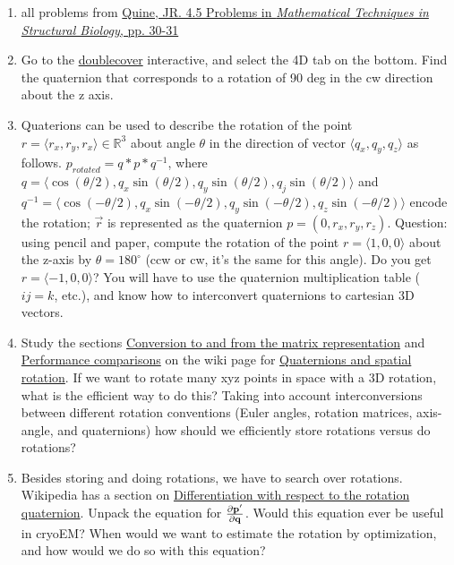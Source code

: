 \documentclass[11pt, oneside]{article}   	%
\begin{document}
\begin{enumerate}
	\item all problems from \href{https://accio.github.io/AMIDD/assets/2020/04/JRQuine-MathBiophysicsBook.pdf}{Quine, JR. 4.5 Problems in {\it Mathematical Techniques in Structural Biology},  pp. 30-31}
	\item Go to the \href{https://eater.net/quaternions/video/doublecover}{doublecover} interactive, and select the 4D tab on the bottom. Find the quaternion that corresponds to a rotation of 90 deg in the cw direction about the z axis.
	\item Quaterions can be used to describe the rotation of the point $ r= \langle r_x,r_y,r_x \rangle \in \mathbb{R}^3$ about angle $\theta$ in the direction of vector $\langle q_x,q_y,q_z \rangle$ as follows. $p_{rotated} = q*p*q^{-1}$, where $q = \langle \cos(\theta/2),q_x\sin(\theta/2),q_y\sin(\theta/2),q_j\sin(\theta/2)\rangle$ and \\ $q^{-1}=\langle \cos(-\theta/2),q_x\sin(-\theta/2),q_y\sin(-\theta/2),q_z\sin(-\theta/2) \rangle$ encode the rotation; $\vec r$ is represented as the quaternion $p=(0,r_x,r_y,r_z)$. Question: using pencil and paper, compute the rotation of the point $ r=\langle1,0,0\rangle$ about the z-axis by $\theta=180^{\circ}$ (ccw or cw, it's the same for this angle). Do you get $r=\langle-1,0,0\rangle$? You will have to use the quaternion multiplication table ($ij=k$, etc.), and know how to interconvert quaternions to cartesian 3D vectors.
	\item Study the sections \href{https://en.wikipedia.org/wiki/Quaternions_and_spatial_rotation#Conversion to and from the matrix representation}{Conversion to and from the matrix representation} and \href{https://en.wikipedia.org/wiki/Quaternions_and_spatial_rotation#Performance_comparisons}{Performance comparisons} on the wiki page for \href{https://en.wikipedia.org/wiki/Quaternions_and_spatial_rotation}{Quaternions and spatial rotation}. If we want to rotate many xyz points in space with a 3D rotation, what is the efficient way to do this? Taking into account interconversions between different rotation conventions (Euler angles, rotation matrices, axis-angle, and quaternions) how should we efficiently store rotations versus do rotations?
	\item Besides storing and doing rotations, we have to search over rotations. Wikipedia has a section on \href{https://en.wikipedia.org/wiki/Quaternions_and_spatial_rotation#Differentiation_with_respect_to_the_rotation_quaternion}{Differentiation with respect to the rotation quaternion}. Unpack the equation for $\frac{\partial {\bf p'}}{\partial {\bf q}}$. Would this equation ever be useful in cryoEM? When would we want to estimate the rotation by optimization, and how would we do so with this equation?
%	
\end{enumerate}
\end{document}
